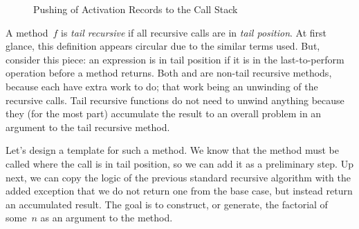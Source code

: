 \begin{figure}
\begin{center}
\end{center}
\caption{Pushing of  Activation Records to the Call Stack}
\end{figure}

A method~$f$ is \emph{tail recursive} if all recursive calls are in \emph{tail position}. 
At first glance, this definition appears circular due to the similar terms used. 
But, consider this piece: an expression is in tail position if it is in the last-to-perform operation before a method returns. 
Both  and  are non-tail recursive methods, because each have extra work to do; that work being an unwinding of the recursive calls. 
Tail recursive functions do not need to unwind anything because they (for the most part) accumulate the result to an overall problem in an argument to the tail recursive method.

Let's design a template for such a method. 
We know that the method must be called where the call is in tail position, so we can add it as a preliminary step. 
Up next, we can copy the logic of the previous standard recursive algorithm with the added exception that we do not return one from the base case, but instead return an accumulated result. 
The goal is to construct, or generate, the factorial of some~$n$ as an argument to the method.

